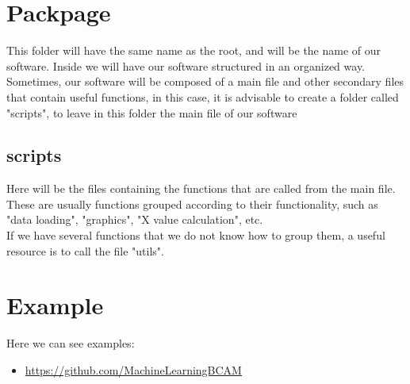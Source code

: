 \documentclass[a4paper]{article}
\begin{document}
	\section{Packpage}
		This folder will have the same name as the root, and will be the name of our software. Inside we will have our software structured in an organized way.\\
		Sometimes, our software will be composed of a main file and other secondary files that contain useful functions, in this case, it is advisable to create a folder called "scripts", to leave in this folder the main file of our software
		\subsection{scripts}
			Here will be the files containing the functions that are called from the main file.\\
			These are usually functions grouped according to their functionality, such as "data loading", "graphics", "X value calculation", etc.\\
			If we have several functions that we do not know how to group them, a useful resource is to call the file "utils".\\
	\section{Example}
		Here we can see examples:\\
		\begin{itemize}
			\item \url{https://github.com/MachineLearningBCAM} \\
		\end{itemize} 				
		
\end{document}
